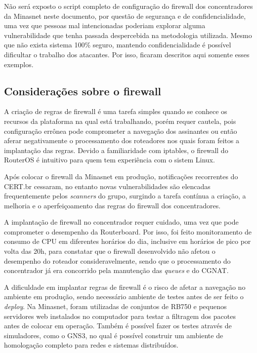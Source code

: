     Não será exposto o script completo de configuração do firewall dos concentradores da Minasnet neste documento, por questão de segurança e de confidencialidade, uma vez que pessoas mal intencionadas poderiam explorar alguma vulnerabilidade que tenha passada despercebida na metodologia utilizada. Mesmo que não exista sistema 100\% seguro, mantendo confidencialidade é possível dificultar o trabalho dos atacantes. Por isso, ficaram descritos aqui somente esses exemplos.
    
\subsection{Considerações sobre o firewall}
    
    A criação de regras de firewall é uma tarefa simples quando se conhece os recursos da plataforma na qual está trabalhando, porém requer cautela, pois configuração errônea pode comprometer a navegação dos assinantes ou então aferar negativamente o processamento dos roteadores nos quais foram feitos a implantação das regras. Devido a familiaridade com iptables, o firewall do RouterOS é intuitivo para quem tem experiência com o sistem Linux.
    
    Após colocar o firewall da Minasnet em produção, notificações recorrentes do CERT.br cessaram, no entanto novas vulnerabilidades são elencadas frequentemente pelos \textit{scanners} do grupo, surgindo a tarefa contínua a criação, a melhoria e o aperfeiçoamento das regras do firewall dos concentradores.
    
    A implantação de firewall no concentrador requer cuidado, uma vez que pode comprometer o desempenho da Routerboard. Por isso, foi feito monitoramento de consumo de CPU em diferentes horários do dia, inclusive em horários de pico por volta das 20h, para constatar que o firewall desenvolvido não afetou o desempenho do roteador consideravelmente, sendo que o processamento do concentrador já era concorrido pela manutenção das \textit{queues} e do CGNAT.
    
    A dificuldade em implantar regras de firewall é o risco de afetar a navegação no ambiente em produção, sendo necessário ambiente de testes antes de ser feito o \textit{deploy}. Na Minasnet, foram utilizadas de conjuntos de RB750 e pequenos servidores web instalados no computador para testar a filtragem dos pacotes antes de colocar em operação. Também é possível fazer os testes através de simuladores, como o GNS3, no qual é possível construir um ambiente de homologação completo para redes e sistemas distribuídos.
    